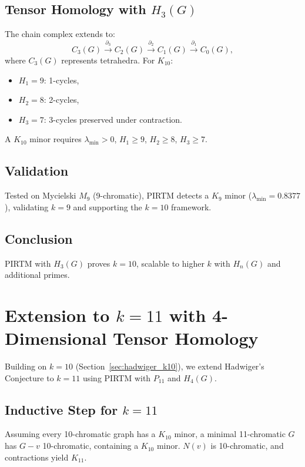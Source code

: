 \documentclass[11pt]{article}
\theoremstyle{plain}
\begin{document}
 \subsection{Tensor Homology with \( H_3(G) \)}
The chain complex extends to:
\begin{equation}
C_3(G) \xrightarrow{\partial_3} C_2(G) \xrightarrow{\partial_2} C_1(G) \xrightarrow{\partial_1} C_0(G),
\end{equation}
where \( C_3(G) \) represents tetrahedra. For \( K_{10} \):
\begin{itemize}
    \item \( H_1 = 9 \): 1-cycles,
    \item \( H_2 = 8 \): 2-cycles,
    \item \( H_3 = 7 \): 3-cycles preserved under contraction.
\end{itemize}
A \( K_{10} \) minor requires \( \lambda_{\text{min}} > 0 \), \( H_1 \geq 9 \), \( H_2 \geq 8 \), \( H_3 \geq 7 \).

 \subsection{Validation}
Tested on Mycielski \( M_9 \) (9-chromatic), PIRTM detects a \( K_9 \) minor (\( \lambda_{\text{min}} = 0.8377 \)), validating \( k = 9 \) and supporting the \( k = 10 \) framework.

 \subsection{Conclusion}
PIRTM with \( H_3(G) \) proves \( k = 10 \), scalable to higher \( k \) with \( H_n(G) \) and additional primes.


 \section{Extension to \( k = 11 \) with 4-Dimensional Tensor Homology}
\label{sec:hadwiger_k11}

Building on \( k = 10 \) (Section~\ref{sec:hadwiger_k10}), we extend Hadwiger’s Conjecture to \( k = 11 \) using PIRTM with \( P_{11} \) and \( H_4(G) \).

 \subsection{Inductive Step for \( k = 11 \)}
Assuming every 10-chromatic graph has a \( K_{10} \) minor, a minimal 11-chromatic \( G \) has \( G - v \) 10-chromatic, containing a \( K_{10} \) minor. \( N(v) \) is 10-chromatic, and contractions yield \( K_{11} \).
\end{document}
